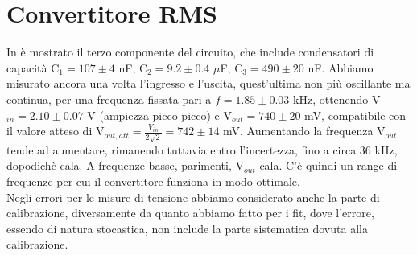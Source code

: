 \section{Convertitore RMS}
In  è mostrato il terzo componente del circuito, che include condensatori di capacità C$_1 = 107 \pm 4$ nF, C$_2 = 9.2 \pm 0.4$ $\mu$F, C$_3 = 490 \pm 20$ nF. Abbiamo misurato ancora una volta l'ingresso e l'uscita, quest'ultima non più oscillante ma continua, per una frequenza fissata pari a $f = 1.85 \pm 0.03$ kHz, ottenendo V$_{in} = 2.10 \pm 0.07$ V (ampiezza picco-picco) e V$_{out} = 740 \pm 20$ mV, compatibile con il valore atteso di V$_{out,att} =\frac{V_{in}}{2\sqrt{2}} = 742 \pm 14$ mV. Aumentando la frequenza V$_{out}$ tende ad aumentare, rimanendo tuttavia entro l'incertezza, fino a circa 36 kHz, dopodichè cala. A frequenze basse, parimenti, V$_{out}$ cala. C'è quindi un range di frequenze per cui il convertitore funziona in modo ottimale.\\
Negli errori per le misure di tensione abbiamo considerato anche la parte di calibrazione, diversamente da quanto abbiamo fatto per i fit, dove l'errore, essendo di natura stocastica, non include la parte sistematica dovuta alla calibrazione.

